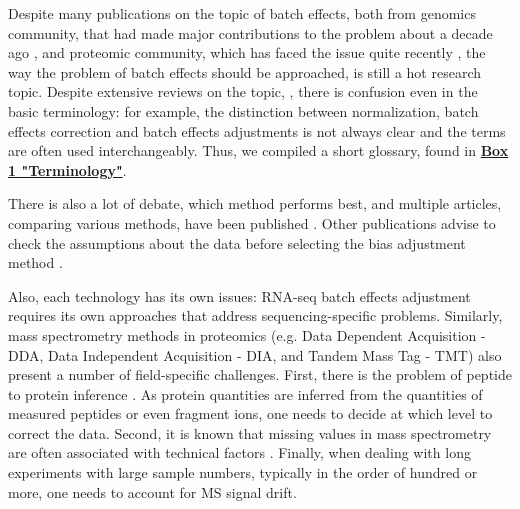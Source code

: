 \documentclass[num-refs]{wiley-article}
\begin{document}
Despite many publications on the topic of batch effects, both from genomics community, that had made major contributions to the problem about a decade ago \cite{Leek:2010aa, Lazar:2013aa, Luo2010, Chen:2011ac, Dillies:2013aa, Chawade:2014aa}, and proteomic community, which has faced the issue quite recently \cite{Karpievitch2012, Chawade:2014aa, Valikangas2018, Gregori2012}, the way the problem of batch effects should be approached, is still a hot research topic. Despite extensive reviews on the topic, \cite{Lazar:2013aa, Leek:2010aa}, there is confusion even in the basic terminology: for example, the distinction between normalization, batch effects correction and batch effects adjustments is not always clear and the terms are often used interchangeably. Thus, we compiled a short glossary, found in \textbf{\hyperref[box:Box1_definitions]{Box 1 "Terminology"}}. 

There is also a lot of debate, which method performs best, and multiple articles, comparing various methods, have been published \cite{Luo2010, Chen:2011ac, Chawade:2014aa}. Other publications advise to check the assumptions about the data before selecting the bias adjustment method \cite{Evans:2018aa, GOH2017498}. 

Also, each technology has its own issues: RNA-seq batch effects adjustment requires its own approaches\cite{Dillies:2013aa} that address sequencing-specific problems. Similarly, mass spectrometry methods in proteomics  (e.g. Data Dependent Acquisition - DDA, Data Independent Acquisition - DIA, and Tandem Mass Tag - TMT) also present a number of field-specific challenges. First, there is the problem of peptide to protein inference \cite{Clough:2012aa, Teo:2015aa, Rosenberger2014a, Choi2014, Muntel:2019aa}. As protein quantities are inferred from the quantities of measured peptides or even fragment ions, one needs to decide at which level to correct the data. Second, it is known that missing values in mass spectrometry are often associated with technical factors \cite{Karpievitch2012, Matafora2017}. Finally, when dealing with long experiments with large sample numbers, typically in the order of hundred or more, one needs to account for MS signal drift. 
\end{document}
